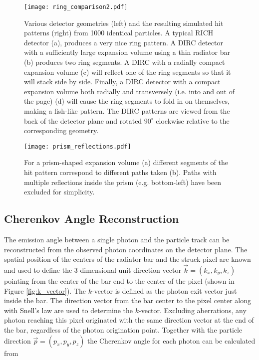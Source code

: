 \begin{figure}[H]
	\centering
	\texttt{[image: ring\_comparison2.pdf]}
	\caption{Various detector geometries (left) and the resulting simulated hit patterns (right) from 1000 identical particles. A typical RICH detector (a), produces a very nice ring pattern. A DIRC detector with a sufficiently large expansion volume using a thin radiator bar (b) produces two ring segments. A DIRC with a radially compact expansion volume (c) will reflect one of the ring segments so that it will stack side by side. Finally, a DIRC detector with a compact expansion volume both radially and transversely (i.e. into and out of the page) (d) will cause the ring segments to fold in on themselves, making a fish-like pattern. The DIRC patterns are viewed from the back of the detector plane and rotated $90^{\circ}$ clockwise relative to the corresponding geometry.}
	\label{fig:ring_comparison2}
\end{figure}


\begin{figure}[H]
	\centering
	\texttt{[image: prism\_reflections.pdf]}
	\caption{For a prism-shaped expansion volume (a) different segments of the hit pattern correspond to different paths taken (b). Paths with multiple reflections inside the prism (e.g. bottom-left) have been excluded for simplicity.}
	\label{fig:prism_reflections}
\end{figure}

\subsection{Cherenkov Angle Reconstruction}
The emission angle between a single photon and the particle track can be reconstructed from the observed photon coordinates on the detector plane. The spatial position of the centers of the radiator bar and the struck pixel are known and used to define the 3-dimensional unit direction vector $\vec{k} = (k_x, k_y, k_z)$ pointing from the center of the bar end to the center of the pixel (shown in Figure \ref{fig:k_vector}). The $k$-vector is defined as the photon exit vector just inside the bar. The direction vector from the bar center to the pixel center along with Snell's law are used to determine the $k$-vector. Excluding aberrations, any photon reaching this pixel originated with the same direction vector at the end of the bar, regardless of the photon origination point. Together with the particle direction $\vec{p} = (p_x, p_y, p_z)$ the Cherenkov angle for each photon can be calculated from

